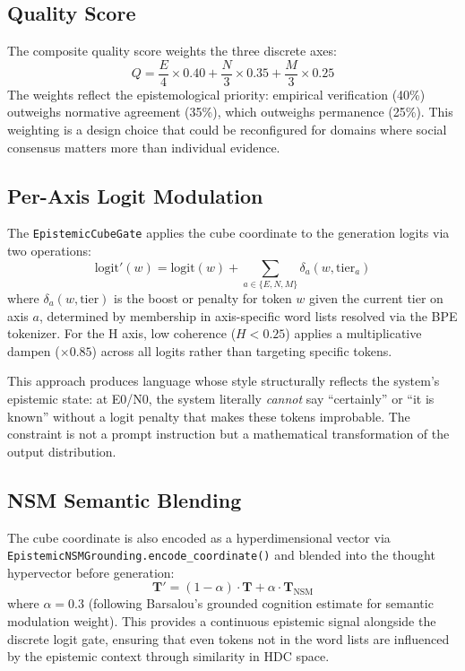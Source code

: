 \documentclass[12pt]{book}
\begin{document}
\subsection{Quality Score}

The composite quality score weights the three discrete axes:
\begin{equation}\label{eq:epistemic-quality}
Q = \frac{E}{4} \times 0.40 + \frac{N}{3} \times 0.35 + \frac{M}{3} \times 0.25
\end{equation}
The weights reflect the epistemological priority: empirical verification (40\%) outweighs normative agreement (35\%), which outweighs permanence (25\%). This weighting is a design choice that could be reconfigured for domains where social consensus matters more than individual evidence.

\subsection{Per-Axis Logit Modulation}

The \texttt{EpistemicCubeGate} applies the cube coordinate to the generation logits via two operations:
\begin{equation}
\text{logit}'(w) = \text{logit}(w) + \sum_{a \in \{E, N, M\}} \delta_a(w, \text{tier}_a)
\end{equation}
where $\delta_a(w, \text{tier})$ is the boost or penalty for token $w$ given the current tier on axis $a$, determined by membership in axis-specific word lists resolved via the BPE tokenizer. For the H axis, low coherence ($H < 0.25$) applies a multiplicative dampen ($\times 0.85$) across all logits rather than targeting specific tokens.

This approach produces language whose style structurally reflects the system's epistemic state: at E0/N0, the system literally \textit{cannot} say ``certainly'' or ``it is known'' without a logit penalty that makes these tokens improbable. The constraint is not a prompt instruction but a mathematical transformation of the output distribution.

\subsection{NSM Semantic Blending}

The cube coordinate is also encoded as a hyperdimensional vector via \texttt{EpistemicNSMGrounding.encode\_coordinate()} and blended into the thought hypervector before generation:
\begin{equation}
\mathbf{T}' = (1 - \alpha) \cdot \mathbf{T} + \alpha \cdot \mathbf{T}_{\text{NSM}}
\end{equation}
where $\alpha = 0.3$ (following Barsalou's grounded cognition estimate for semantic modulation weight). This provides a continuous epistemic signal alongside the discrete logit gate, ensuring that even tokens not in the word lists are influenced by the epistemic context through similarity in HDC space.
\end{document}
